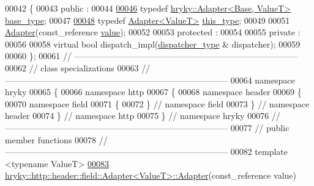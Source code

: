\begin{DoxyCode}
00042 \{
00043 \textcolor{keyword}{public} :
00044 
\hypertarget{http__header__field__adapter_8h_source_l00046}{}\hyperlink{classhryky_1_1http_1_1header_1_1field_1_1_adapter_af0a2d78ffc8d5dcfbc9ca6cead025da2}{00046}     \textcolor{keyword}{typedef} \hyperlink{classhryky_1_1_adapter}{hryky::Adapter<Base, ValueT>} \hyperlink{classhryky_1_1http_1_1header_1_1field_1_1_adapter_af0a2d78ffc8d5dcfbc9ca6cead025da2}{base_type};
00047 
\hypertarget{http__header__field__adapter_8h_source_l00048}{}\hyperlink{classhryky_1_1http_1_1header_1_1field_1_1_adapter_ac0e236f0b00e87302473a0623441d22a}{00048}     \textcolor{keyword}{typedef} \hyperlink{classhryky_1_1http_1_1header_1_1field_1_1_adapter}{Adapter<ValueT>} \hyperlink{classhryky_1_1http_1_1header_1_1field_1_1_adapter_ac0e236f0b00e87302473a0623441d22a}{this_type};
00049 
00051     \hyperlink{classhryky_1_1_adapter_aad569390e8fc9963c8849cbd0c59bea9}{Adapter}(const\_reference \hyperlink{classhryky_1_1_adapter_ab736ecd30f215ca3cbd2364f818cb83f}{value});
00052 
00053 \textcolor{keyword}{protected} :
00054 
00055 \textcolor{keyword}{private} :
00056 
00058     \textcolor{keyword}{virtual} \textcolor{keywordtype}{bool} dispatch\_impl(\hyperlink{classhryky_1_1http_1_1header_1_1field_1_1dispatcher_1_1_base}{dispatcher_type} & dispatcher);
00059 
00060 \};
00061 \textcolor{comment}{//
      ------------------------------------------------------------------------------}
00062 \textcolor{comment}{// class specializations}
00063 \textcolor{comment}{//
      ------------------------------------------------------------------------------}
00064 \textcolor{keyword}{namespace }hryky
00065 \{
00066 \textcolor{keyword}{namespace }http
00067 \{
00068 \textcolor{keyword}{namespace }header
00069 \{
00070 \textcolor{keyword}{namespace }field
00071 \{
00072 \} \textcolor{comment}{// namespace field}
00073 \} \textcolor{comment}{// namespace header}
00074 \} \textcolor{comment}{// namespace http}
00075 \} \textcolor{comment}{// namespace hryky}
00076 \textcolor{comment}{//
      ------------------------------------------------------------------------------}
00077 \textcolor{comment}{// public member functions}
00078 \textcolor{comment}{//
      ------------------------------------------------------------------------------}
00082 \textcolor{comment}{}\textcolor{keyword}{template} <\textcolor{keyword}{typename} ValueT>
\hypertarget{http__header__field__adapter_8h_source_l00083}{}\hyperlink{classhryky_1_1http_1_1header_1_1field_1_1_adapter_a03728ea597524f9c0b91dfc65a3033b0}{00083} \hyperlink{classhryky_1_1_adapter_aad569390e8fc9963c8849cbd0c59bea9}{hryky::http::header::field::Adapter<ValueT>::Adapter}(const\_reference value)

\end{DoxyCode}
